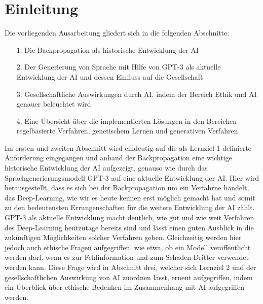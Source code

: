 \chapter{Einleitung}
 Die vorliegenden Ausarbeitung gliedert sich in die folgenden Abschnitte:
 
 \begin{itemize}
 	\item[1.] Die Backpropagation als historische Entwicklung der AI
 	\item[2.] Der Generierung von Sprache mit Hilfe von GPT-3 als aktuelle Entwicklung der AI und dessen Einfluss auf die Gesellschaft
 	\item[3.] Gesellschaftliche Auswirkungen durch AI, indem der Bereich Ethik und AI genauer beleuchtet wird
 	\item[4.] Eine Übersicht über die implementierten Lösungen in den Bereichen regelbasierte Verfahren, genetischem Lernen und generativen Verfahren
 \end{itemize}

Im ersten und zweiten Abschnitt wird eindeutig auf die als Lernziel 1 definierte Anforderung eingegangen und anhand der Backpropagation eine wichtige historische Entwicklung der AI aufgezeigt, genauso wie durch das Sprachgenerierungsmodell GPT-3 auf eine aktuelle Entwicklung der AI. Hier wird herausgestellt, dass es sich bei der Backpropagation um ein Verfahrne handelt, das Deep-Learning, wie wir es heute kennen erst möglich gemacht hat und somit zu den bedeutensten Errungenschaften für die weitere Entwicklung der AI zählt. GPT-3 als aktuelle Entwicklung macht deutlich, wie gut und wie weit Verfahren des Deep-Learning heutzutage bereits sind und lässt einen guten Ausblick in die zukünftigen Möglichkeiten solcher Verfahren geben. Gleichzeitig werden hier jedoch auch ethische Fragen aufgegriffen, wie etwa, ob ein Modell veröffentlicht werden darf, wenn es zur Fehlinformation und zum Schaden Dritter verwendet werden kann. Diese Frage wird in Abschnitt drei, welcher sich Lernziel 2 und der gesellschaftlichen Auswirkung von AI zuordnen lässt, erneut aufgegriffen, indem ein Überblick über ethische Bedenken im Zusammenhang mit AI aufgegriffen werden. 
